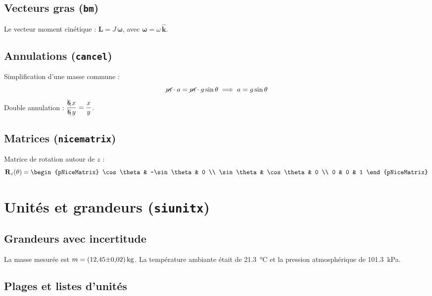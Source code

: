 \documentclass{poly}
\begin{document}
\subsection{Vecteurs gras (\texttt{bm})}

Le vecteur moment cinétique : $\bm{L} = J\,\bm{\omega}$, avec
$\bm{\omega} = \omega\,\hat{\bm{k}}$.

\subsection{Annulations (\texttt{cancel})}

Simplification d'une masse commune :
\[
    \cancel{m} \cdot a = \cancel{m} \cdot g \sin\theta
    \implies a = g\sin\theta
\]
Double annulation : $\dfrac{\bcancel{6}\,x}{\bcancel{6}\,y} = \dfrac{x}{y}$.

\subsection{Matrices (\texttt{nicematrix})}

Matrice de rotation autour de $z$ :
\begin{equation}
    \mathbf{R}_z(\theta) =
    \begin{pNiceMatrix}
        \cos\theta & -\sin\theta & 0 \\
        \sin\theta &  \cos\theta & 0 \\
        0          &  0          & 1
    \end{pNiceMatrix}
    \label{eq:rotation}
\end{equation}

\section{Unités et grandeurs (\texttt{siunitx})}\label{sec:mesures}

\subsection{Grandeurs avec incertitude}

La masse mesurée est $m = \SI{12,45 \pm 0,02}{\kilogram}$.
La température ambiante était de \SI{21,3}{\degreeCelsius} et la
pression atmosphérique de \SI{101,3}{\kilo\pascal}.

\subsection{Plages et listes d'unités}
\end{document}
